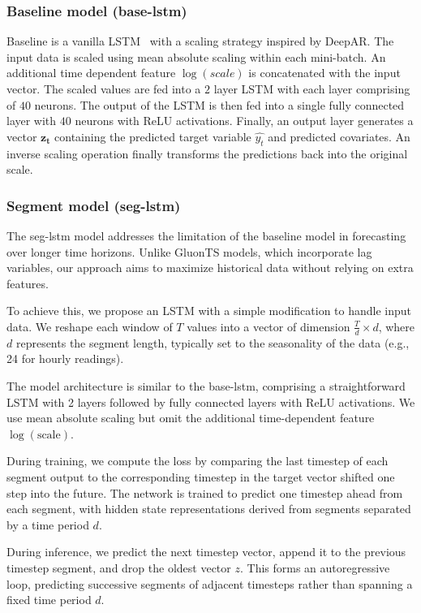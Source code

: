 \documentclass{article}
\begin{document}
\subsubsection{Baseline model (base-lstm)}
Baseline is a vanilla LSTM~\cite{HochSchm97} with a scaling strategy inspired by DeepAR\cite{salinas2019deepar}.
The input data is scaled using mean absolute scaling within each mini-batch. An additional time dependent feature $\log(scale)$ is concatenated with the input vector. The scaled values are fed into a $2$ layer 
LSTM with each layer comprising of $40$ neurons. The output of the LSTM is then fed into a single fully connected layer 
with $40$ neurons with ReLU activations. Finally, an output layer generates a vector $\mathbf{z_t}$ 
containing the predicted target variable $\hat{y_t}$ and predicted covariates.  An inverse scaling operation finally transforms 
the predictions back into the original scale.

\subsubsection{Segment model (seg-lstm)}
The seg-lstm model addresses the limitation of the baseline model in forecasting over longer time horizons. 
Unlike GluonTS models, which incorporate lag variables, our approach aims to maximize historical data without relying on extra features.

To achieve this, we propose an LSTM with a simple modification to handle input data. We reshape each window of $T$ values 
into a vector of dimension $\frac{T}{d} \times d$, where $d$ represents the segment length, typically set to the seasonality
 of the data (e.g., 24 for hourly readings).

The model architecture is similar to the base-lstm, comprising a straightforward LSTM with 2 layers followed by fully connected 
layers with ReLU activations. We use mean absolute scaling but omit the additional time-dependent feature $\log(\text{scale})$.

During training, we compute the loss by comparing the last timestep of each segment output to the corresponding timestep in the 
target vector shifted one step into the future. The network is trained to predict one timestep ahead from each segment, with hidden 
state representations derived from segments separated by a time period $d$.

During inference, we predict the next timestep vector, append it to the previous timestep segment, and drop the oldest vector $z$. 
This forms an autoregressive loop, predicting successive segments of adjacent timesteps rather than spanning a fixed time period $d$.
\end{document}
